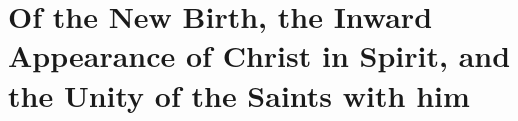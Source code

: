 \documentclass[../main.tex]{subfiles}
\begin{document}
	
	\chapter{Of the New Birth, the Inward Appearance of Christ in Spirit, and the Unity of the Saints with him}
	
	
	
	\theendnotes
	\setcounter{endnote}{0}
\end{document}
